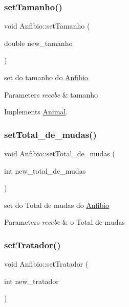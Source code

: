\subsubsection{\texorpdfstring{setTamanho()}{setTamanho()}}
{\footnotesize\ttfamily void Anfibio\+::set\+Tamanho (\begin{DoxyParamCaption}\item[{double}]{new\+\_\+tamanho }\end{DoxyParamCaption})\hspace{0.3cm}{\ttfamily [virtual]}}



set do tamanho do \mbox{\hyperlink{class_anfibio}{Anfibio}} 


\begin{DoxyParams}{Parameters}
{\em recebe} & tamanho \\
\hline
\end{DoxyParams}


Implements \mbox{\hyperlink{class_animal}{Animal}}.

\mbox{\label{class_anfibio_a5b8ad6d83082f10ff2b8bd92ccff2753}} 
\subsubsection{\texorpdfstring{setTotal\_de\_mudas()}{setTotal\_de\_mudas()}}
{\footnotesize\ttfamily void Anfibio\+::set\+Total\+\_\+de\+\_\+mudas (\begin{DoxyParamCaption}\item[{int}]{new\+\_\+total\+\_\+de\+\_\+mudas }\end{DoxyParamCaption})}



set do Total de mudas do \mbox{\hyperlink{class_anfibio}{Anfibio}} 


\begin{DoxyParams}{Parameters}
{\em recebe} & o Total de mudas \\
\hline
\end{DoxyParams}
\mbox{\label{class_anfibio_a211278b47e3736c699ffd08f3473ddf8}} 
\subsubsection{\texorpdfstring{setTratador()}{setTratador()}}
{\footnotesize\ttfamily void Anfibio\+::set\+Tratador (\begin{DoxyParamCaption}\item[{int}]{new\+\_\+tratador }\end{DoxyParamCaption})\hspace{0.3cm}{\ttfamily [virtual]}}



